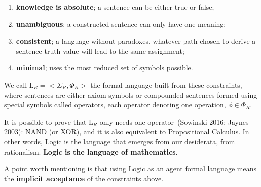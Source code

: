 \documentclass[
  letterpaper,
  12pt,
  british]{tufte-book}
\theoremstyle{plain}
\theoremstyle{plain}
\theoremstyle{definition}
\theoremstyle{remark}
\begin{document}
\begin{enumerate}
\def\labelenumi{\roman{enumi}.}
\item
  \textbf{knowledge is absolute}; a sentence can be either true or false;
\item
  \textbf{unambiguous}; a constructed sentence can only have one
  meaning;
\item
  \textbf{consistent}; a language without paradoxes, whatever path
  chosen to derive a sentence truth value will lead to the same
  assignment;
\item
  \textbf{minimal}; uses the most reduced set of symbols possible.
\end{enumerate}

We call \(\mathrm{L}_R= <\Sigma_R, \Phi_R>\) the formal language built
from these constraints, where sentences are either axiom symbols or
compounded sentences formed using special symbols called operators, each
operator denoting one operation, \(\phi \in \Phi_R\).

It is possible to prove that \(\mathrm{L}_R\) only needs one
operator~(Sowinski 2016; Jaynes
2003):
{NAND} (or {XOR}), and it is also equivalent to Propositional
Calculus. In other words, Logic
is the language that emerges from our desiderata, from rationalism.
\textbf{Logic is the language of mathematics}.

A point worth mentioning is that using Logic as an agent formal language
means the \textbf{implicit acceptance} of the constraints above.
\end{document}
